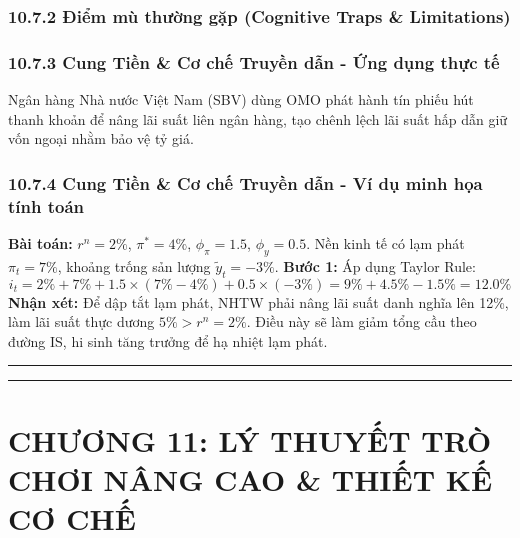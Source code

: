 \documentclass[
]{article}
\begin{document}
\subsubsection{10.7.2 Điểm mù thường gặp (Cognitive Traps \&
Limitations)}\label{ux111iux1ec3m-muxf9-thux1b0ux1eddng-gux1eb7p-cognitive-traps-limitations-89}

\subsubsection{10.7.3 Cung Tiền \& Cơ chế Truyền dẫn - Ứng dụng thực
tế}\label{cung-tiux1ec1n-cux1a1-chux1ebf-truyux1ec1n-dux1eabn---ux1ee9ng-dux1ee5ng-thux1ef1c-tux1ebf}

Ngân hàng Nhà nước Việt Nam (SBV) dùng OMO phát hành tín phiếu hút thanh
khoản để nâng lãi suất liên ngân hàng, tạo chênh lệch lãi suất hấp dẫn
giữ vốn ngoại nhằm bảo vệ tỷ giá.

\subsubsection{10.7.4 Cung Tiền \& Cơ chế Truyền dẫn - Ví dụ minh họa
tính
toán}\label{cung-tiux1ec1n-cux1a1-chux1ebf-truyux1ec1n-dux1eabn---vuxed-dux1ee5-minh-hux1ecda-tuxednh-touxe1n}

\textbf{Bài toán:} \(r^n = 2\%\), \(\pi^* = 4\%\), \(\phi_{\pi} = 1.5\),
\(\phi_y = 0.5\). Nền kinh tế có lạm phát \(\pi_t = 7\%\), khoảng trống
sản lượng \(\tilde{y}_t = -3\%\). \textbf{Bước 1:} Áp dụng Taylor Rule:
\[ i_t = 2\% + 7\% + 1.5 \times (7\% - 4\%) + 0.5 \times (-3\%) = 9\% + 4.5\% - 1.5\% = 12.0\% \]
\textbf{Nhận xét:} Để dập tắt lạm phát, NHTW phải nâng lãi suất danh
nghĩa lên 12\%, làm lãi suất thực dương \(5\% > r^n = 2\%\). Điều này sẽ
làm giảm tổng cầu theo đường IS, hi sinh tăng trưởng để hạ nhiệt lạm
phát.

\begin{center}\rule{0.5\linewidth}{0.5pt}\end{center}

\begin{center}\rule{0.5\linewidth}{0.5pt}\end{center}

\section{CHƯƠNG 11: LÝ THUYẾT TRÒ CHƠI NÂNG CAO \& THIẾT KẾ CƠ
CHẾ}\label{chux1b0ux1a1ng-11-luxfd-thuyux1ebft-truxf2-chux1a1i-nuxe2ng-cao-thiux1ebft-kux1ebf-cux1a1-chux1ebf}
\end{document}
